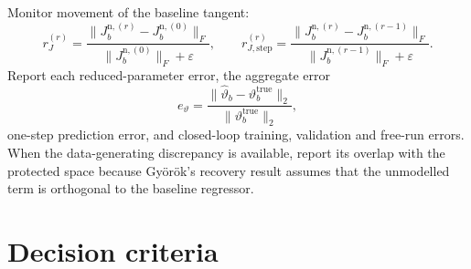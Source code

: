 \documentclass[11pt,a4paper]{article}
\begin{document}
Monitor movement of the baseline tangent:
\begin{equation}
    r_J^{(r)}
    =\frac{\|J_b^{\mathrm n,(r)}-J_b^{\mathrm n,(0)}\|_F}
    {\|J_b^{\mathrm n,(0)}\|_F+\varepsilon},
    \qquad
    r_{J,\mathrm{step}}^{(r)}
    =\frac{\|J_b^{\mathrm n,(r)}-J_b^{\mathrm n,(r-1)}\|_F}
    {\|J_b^{\mathrm n,(r-1)}\|_F+\varepsilon}.
\end{equation}
Report each reduced-parameter error, the aggregate error
\begin{equation}
    e_{\vartheta}
    =\frac{\|\widehat\vartheta_b-\vartheta_b^{\mathrm{true}}\|_2}
    {\|\vartheta_b^{\mathrm{true}}\|_2},
\end{equation}
one-step prediction error, and closed-loop training, validation and free-run
errors. When the data-generating discrepancy is available, report its overlap
with the protected space because Gy\"or\"ok's recovery result assumes that the
unmodelled term is orthogonal to the baseline regressor.

\section{Decision criteria}
\end{document}
